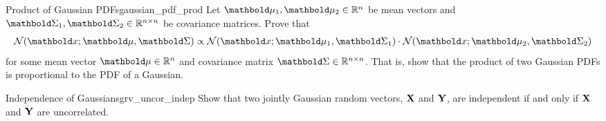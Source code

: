 \begin{nexercise}{Product of Gaussian PDFs}{gaussian_pdf_prod}
  Let $\vmu_1, \vmu_2 \in \R^n$ be mean vectors and $\mSigma_1, \mSigma_2 \in \R^{n \times n}$ be covariance matrices. Prove that \begin{align}
    \N[\vx]{\vmu}{\mSigma} \propto \N[\vx]{\vmu_1}{\mSigma_1} \cdot \N[\vx]{\vmu_2}{\mSigma_2} \label{eq:gaussian_pdf_product}
  \end{align} for some mean vector $\vmu \in \R^n$ and covariance matrix $\mSigma \in \R^{n \times n}$.
  That is, show that the product of two Gaussian PDFs is proportional to the PDF of a Gaussian.
\end{nexercise}

\begin{nexercise}{Independence of Gaussians}{grv_uncor_indep}
  Show that two jointly Gaussian random vectors, $\mathbf{X}$ and $\mathbf{Y}$, are independent if and only if $\mathbf{X}$ and $\mathbf{Y}$ are uncorrelated.
\end{nexercise}

